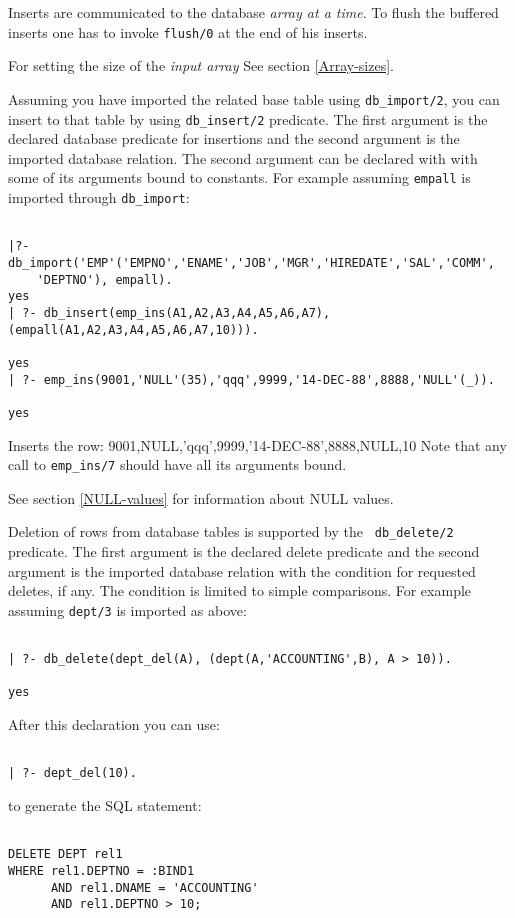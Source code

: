 Inserts are communicated to the database {\it array at a time}.
To flush the buffered inserts one has to invoke {\tt flush/0}
at the end of his inserts. 

For setting the size of the {\it input array} See section \ref{Array-sizes}.

Assuming you have imported the related base table using {\tt db\_import/2}, you can insert to
that table by using {\tt db\_insert/2} predicate.  The first argument is
the declared database predicate for insertions and the second argument
is the imported database relation.  The second argument can be declared with
with some of its arguments bound to constants.  For example assuming {\tt empall} is imported through {\tt db\_import}:
\begin{verbatim}

|?- db_import('EMP'('EMPNO','ENAME','JOB','MGR','HIREDATE','SAL','COMM',
	'DEPTNO'), empall).
yes 
| ?- db_insert(emp_ins(A1,A2,A3,A4,A5,A6,A7),(empall(A1,A2,A3,A4,A5,A6,A7,10))).

yes
| ?- emp_ins(9001,'NULL'(35),'qqq',9999,'14-DEC-88',8888,'NULL'(_)).

yes
\end{verbatim}
Inserts the row: 9001,NULL,'qqq',9999,'14-DEC-88',8888,NULL,10
Note that any call to {\tt emp\_ins/7} should have all its arguments bound.

See section \ref{NULL-values} for information about NULL values.

Deletion of rows from database tables is supported by the {\tt
db\_delete/2} predicate.  The first argument is the declared delete
predicate and the second argument is the imported database relation
with the condition for requested deletes, if any.  The condition is
limited to simple comparisons.  For example assuming
{\tt dept/3} is imported as above:
\begin{verbatim}

| ?- db_delete(dept_del(A), (dept(A,'ACCOUNTING',B), A > 10)). 

yes
\end{verbatim}

After this declaration you can use:
\begin{verbatim}

| ?- dept_del(10).
\end{verbatim}

to generate the SQL statement:
\begin{verbatim}

DELETE DEPT rel1 
WHERE rel1.DEPTNO = :BIND1 
      AND rel1.DNAME = 'ACCOUNTING'
      AND rel1.DEPTNO > 10;
\end{verbatim}


